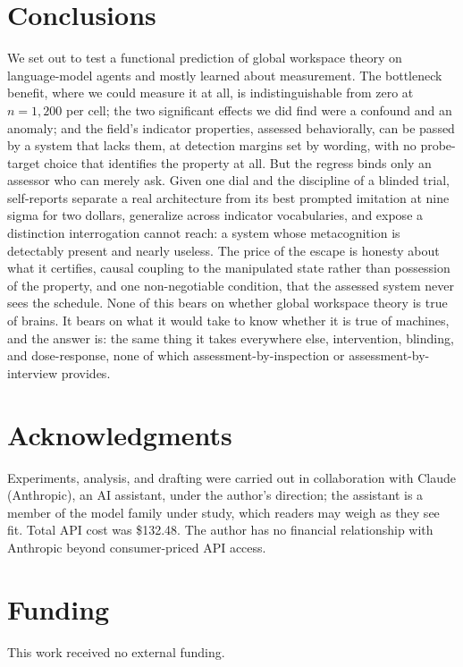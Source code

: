 \documentclass[11pt]{article}
\begin{document}
\section{Conclusions}

We set out to test a functional prediction of global workspace theory on
language-model agents and mostly learned about measurement. The bottleneck
benefit, where we could measure it at all, is indistinguishable from zero at
$n=1{,}200$ per cell; the two significant effects we did find were a confound
and an anomaly; and the field's indicator properties, assessed behaviorally, can
be passed by a system that lacks them, at detection margins set by wording,
with no probe-target choice that identifies the property at all. But the
regress binds only an assessor who can merely ask. Given one dial and the
discipline of a blinded trial, self-reports separate a real architecture from
its best prompted imitation at nine sigma for two dollars, generalize across
indicator vocabularies, and expose a distinction interrogation cannot reach:
a system whose metacognition is detectably present and nearly useless. The
price of the escape is honesty about what it certifies, causal coupling to
the manipulated state rather than possession of the property, and one
non-negotiable condition, that the assessed system never sees the schedule.
None of this bears on whether global workspace theory is true of brains. It
bears on what it would take to know whether it is true of machines, and the
answer is: the same thing it takes everywhere else, intervention, blinding,
and dose-response, none of which assessment-by-inspection or
assessment-by-interview provides.

\section*{Acknowledgments}

Experiments, analysis, and drafting were carried out in collaboration with
Claude (Anthropic), an AI assistant, under the author's direction; the assistant
is a member of the model family under study, which readers may weigh as they see
fit. Total API cost was \$132.48. The author has no financial relationship with
Anthropic beyond consumer-priced API access.

\section*{Funding}

This work received no external funding.
\end{document}
